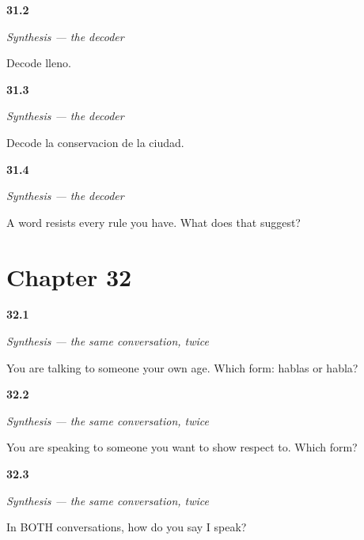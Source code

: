 \noindent\begin{minipage}[t]{\linewidth}
\raggedright
\hypertarget{review-ES-C57-sintesis-descifrar-ll}{\textbf{31.2}} \emph{Synthesis — the decoder}\par
\small Decode lleno.
\end{minipage}\par\medskip

\noindent\begin{minipage}[t]{\linewidth}
\raggedright
\hypertarget{review-ES-C57-sintesis-descifrar-mix}{\textbf{31.3}} \emph{Synthesis — the decoder}\par
\small Decode la conservacion de la ciudad.
\end{minipage}\par\medskip

\noindent\begin{minipage}[t]{\linewidth}
\raggedright
\hypertarget{review-ES-C57-sintesis-descifrar-limits}{\textbf{31.4}} \emph{Synthesis — the decoder}\par
\small A word resists every rule you have. What does that suggest?
\end{minipage}\par\medskip

\section*{Chapter 32}

\noindent\begin{minipage}[t]{\linewidth}
\raggedright
\hypertarget{review-ES-C06-repaso-hablar-friend}{\textbf{32.1}} \emph{Synthesis — the same conversation, twice}\par
\small You are talking to someone your own age. Which form: hablas or habla?
\end{minipage}\par\medskip

\noindent\begin{minipage}[t]{\linewidth}
\raggedright
\hypertarget{review-ES-C06-repaso-hablar-polite}{\textbf{32.2}} \emph{Synthesis — the same conversation, twice}\par
\small You are speaking to someone you want to show respect to. Which form?
\end{minipage}\par\medskip

\noindent\begin{minipage}[t]{\linewidth}
\raggedright
\hypertarget{review-ES-C06-repaso-hablar-self}{\textbf{32.3}} \emph{Synthesis — the same conversation, twice}\par
\small In BOTH conversations, how do you say I speak?
\end{minipage}\par\medskip

